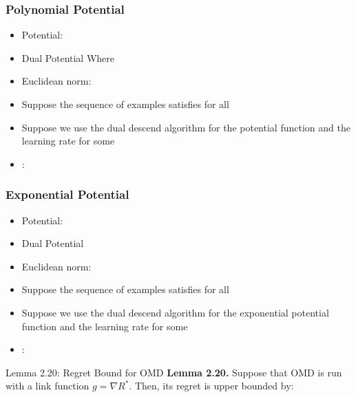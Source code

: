 \documentclass[handout]{beamer}
\begin{document}
\begin{small}
\begin{frame}
  \frametitle{Polynomial Potential}
  \begin{itemize}
  \item Potential: 
  \item Dual Potential  Where
  \item Euclidean norm: 
  \item Suppose the sequence of examples
     satisfies  for all 
  \item Suppose we use the dual descend algorithm for the potential
    function  and the learning rate  for some 
  \item {}:\\
  \end{itemize}
\end{frame}

\begin{frame}
\frametitle{Exponential Potential}
  \begin{itemize}
  \item Potential: 
  \item Dual Potential 
  \item Euclidean norm: 
  \item Suppose the sequence of examples
     satisfies  for all 
  \item Suppose we use the dual descend algorithm for the exponential potential
    function \R{$\Phi$} and the learning rate   for some 
  \item {}:\\
  \end{itemize}
\end{frame}

\begin{frame}{Lemma 2.20: Regret Bound for OMD}
\textbf{Lemma 2.20.} Suppose that OMD is run with a link function \( g = \nabla R^* \). Then, its regret is upper bounded by:


\end{frame}
\end{small}
\end{document}

